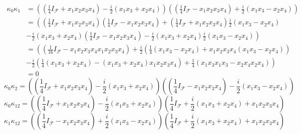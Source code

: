 \documentclass[aps,preprint]{revtex4}%
\begin{document}
\begin{align}
\kappa_{0}\kappa_{1} &  =\left(  \left(  \frac{1}{4}I_{\mathcal{F}}+x_{1}%
x_{2}x_{3}x_{4}\right)  -\frac{i}{2}\left(  x_{1}x_{3}+x_{2}x_{4}\right)
\right)  \left(  \left(  \frac{1}{4}I_{\mathcal{F}}-x_{1}x_{2}x_{3}%
x_{4}\right)  +\frac{i}{2}\left(  x_{1}x_{3}-x_{2}x_{4}\right)  \right)  \\
&  =\left(  \left(  \frac{1}{4}I_{\mathcal{F}}+x_{1}x_{2}x_{3}x_{4}\right)
\left(  \frac{1}{4}I_{\mathcal{F}}-x_{1}x_{2}x_{3}x_{4}\right)  +\left(
\frac{1}{4}I_{\mathcal{F}}+x_{1}x_{2}x_{3}x_{4}\right)  \frac{i}{2}\left(
x_{1}x_{3}-x_{2}x_{4}\right)  \right.  \\
&  \left.  -\frac{i}{2}\left(  x_{1}x_{3}+x_{2}x_{4}\right)  \left(  \frac
{1}{4}I_{\mathcal{F}}-x_{1}x_{2}x_{3}x_{4}\right)  -\frac{i}{2}\left(
x_{1}x_{3}+x_{2}x_{4}\right)  \frac{i}{2}\left(  x_{1}x_{3}-x_{2}x_{4}\right)
\right)  \\
&  =\left(  \left(  \frac{1}{16}I_{\mathcal{F}}-x_{1}x_{2}x_{3}x_{4}x_{1}%
x_{2}x_{3}x_{4}\right)  +\frac{i}{2}\left(  \frac{1}{4}\left(  x_{1}%
x_{3}-x_{2}x_{4}\right)  +x_{1}x_{2}x_{3}x_{4}\left(  x_{1}x_{3}-x_{2}%
x_{4}\right)  \right)  \right.  \\
&  \left.  -\frac{i}{2}\left(  \frac{1}{4}\left(  x_{1}x_{3}+x_{2}%
x_{4}\right)  -\left(  x_{1}x_{3}+x_{2}x_{4}\right)  x_{1}x_{2}x_{3}%
x_{4}\right)  +\frac{1}{4}\left(  x_{1}x_{3}x_{1}x_{3}-x_{2}x_{4}x_{2}%
x_{4}\right)  \right)  \\
&  =0
\end{align}%
\begin{equation}
\kappa_{0}\kappa_{2}=\left(  \left(  \frac{1}{4}I_{\mathcal{F}}+x_{1}%
x_{2}x_{3}x_{4}\right)  -\frac{i}{2}\left(  x_{1}x_{3}+x_{2}x_{4}\right)
\right)  \left(  \left(  \frac{1}{4}I_{\mathcal{F}}-x_{1}x_{2}x_{3}%
x_{4}\right)  -\frac{i}{2}\left(  x_{1}x_{3}-x_{2}x_{4}\right)  \right)
\end{equation}%
\begin{equation}
\kappa_{0}\kappa_{12}=\left(  \left(  \frac{1}{4}I_{\mathcal{F}}+x_{1}%
x_{2}x_{3}x_{4}\right)  -\frac{i}{2}\left(  x_{1}x_{3}+x_{2}x_{4}\right)
\right)  \left(  \frac{1}{4}I_{\mathcal{F}}+\frac{i}{2}\left(  x_{1}%
x_{3}+x_{2}x_{4}\right)  +x_{1}x_{2}x_{3}x_{4}\right)
\end{equation}%
\begin{equation}
\kappa_{1}\kappa_{12}=\left(  \left(  \frac{1}{4}I_{\mathcal{F}}-x_{1}%
x_{2}x_{3}x_{4}\right)  +\frac{i}{2}\left(  x_{1}x_{3}-x_{2}x_{4}\right)
\right)  \left(  \frac{1}{4}I_{\mathcal{F}}+\frac{i}{2}\left(  x_{1}%
x_{3}+x_{2}x_{4}\right)  +x_{1}x_{2}x_{3}x_{4}\right)
\end{equation}%
\end{document}
